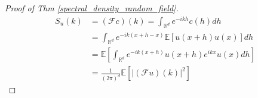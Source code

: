 \documentclass{article}
\begin{document}
\begin{proof}[Proof of Thm \ref{spectral_density_random_field}]
    \begin{equation}
    \begin{aligned}
      S_u(k)&=\left(\mathcal{F}c\right)(k)= \int_{\mathbb{R}^d} e^{-ik h}c(h) dh\\
      &= \int_{\mathbb{R}^d} e^{-ik(x+h - x)}\mathbb{E}\left[u(x+h)u(x)\right] dh\\
      &= \mathbb{E}\left[\int_{\mathbb{R}^d} e^{-ik(x+h)}u(x+h)e^{ikx}u(x) dh\right]\\
      &= \frac{1}{(2\pi)^{d}}\mathbb{E}\left[\left|(\mathcal{F}u)(k)\right|^2\right]
    \end{aligned}
  \end{equation}
\end{proof}
\end{document}
